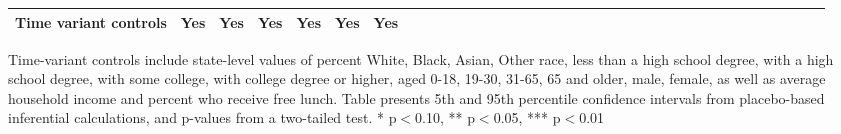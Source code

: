 \begin{table}[htbp]
\begin{center}
\begin{threeparttable}
\begin{tabular}{l*{6}{c c c c c c}}
Time variant controls                  & Yes   & Yes   & Yes   & Yes   & Yes   & Yes            \\
\bottomrule
\end{tabular}
\begin{tablenotes}
\tiny
\item Time-variant controls include state-level values of percent White, Black, Asian, Other race, less than a high school degree, with a high school degree, with some college, with college degree or higher, aged 0-18, 19-30, 31-65, 65 and older, male, female, as well as average household income and percent who receive free lunch.  Table presents 5th and 95th percentile confidence intervals from placebo-based inferential calculations, and p-values from a two-tailed test. * p$<$0.10, ** p$<$0.05, *** p$<$0.01
\end{tablenotes}
\end{threeparttable}
\end{center}
\end{table}
